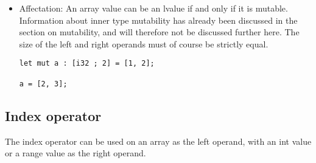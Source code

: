 \begin{itemize}
\item Affectation: An array value can be an lvalue if and only if it is mutable.
  Information about inner type mutability has already been discussed in the
  section on mutability, and will therefore not be discussed further here. The
  size of the left and right operands must of course be strictly equal.

  \begin{lstlisting}[style=coloredverbatim]
let mut a : [i32 ; 2] = [1, 2];

a = [2, 3];
  \end{lstlisting}

\end{itemize}

\subsection {Index operator}

The index operator can be used on an array as the left operand, with an int
value or a range value as the right operand.

